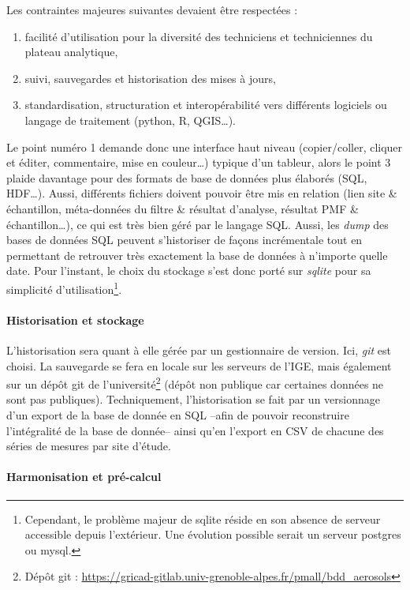 Les contraintes majeures suivantes devaient être respectées :
\begin{enumerate}
    \item facilité d'utilisation pour la diversité des techniciens et techniciennes du
        plateau analytique,
    \item suivi, sauvegardes et historisation des mises à jours,
    \item standardisation, structuration et interopérabilité vers différents logiciels ou
        langage de traitement (python, R, QGIS…).
\end{enumerate}
Le point numéro 1 demande donc une interface haut niveau (copier/coller, cliquer et
éditer, commentaire, mise en couleur…) typique d'un tableur, alors le point 3 plaide
davantage pour des formats de base de données plus élaborés (SQL, HDF…).
Aussi, différents fichiers doivent pouvoir être mis en relation (lien site \&
échantillon, méta-données du
filtre \& résultat d'analyse, résultat PMF \& échantillon…), ce qui est très bien géré
par le langage SQL. Aussi, les \textit{dump} des bases de données SQL peuvent s'historiser
de façons incrémentale tout en permettant de retrouver très exactement la base de données à
n'importe quelle date. 
Pour l'instant, le choix du stockage s'est donc porté sur \textit{sqlite} pour sa
simplicité d'utilisation\footnote{Cependant, le problème majeur de sqlite réside en son
    absence de serveur accessible depuis l'extérieur. Une évolution possible serait un
serveur postgres ou mysql.}.

\paragraph{Historisation et stockage}%
\label{par:historisation_et_stockage}

L'historisation sera quant à elle gérée par un gestionnaire de version. Ici, \textit{git}
est choisi. La sauvegarde se fera en locale sur les serveurs de l'IGE, mais également sur
un dépôt git de l'université\footnote{Dépôt git :
\url{https://gricad-gitlab.univ-grenoble-alpes.fr/pmall/bdd_aerosols}} (dépôt non
publique car certaines données ne sont pas publiques).
Techniquement, l'historisation se fait par un versionnage d'un export de la base de donnée en
SQL --afin de pouvoir reconstruire l'intégralité de la base de donnée-- ainsi qu'en
l'export en CSV de chacune des séries de mesures par site d'étude.

\paragraph{Harmonisation et pré-calcul}%
\label{par:harmonisation_et_pré_calcul}

